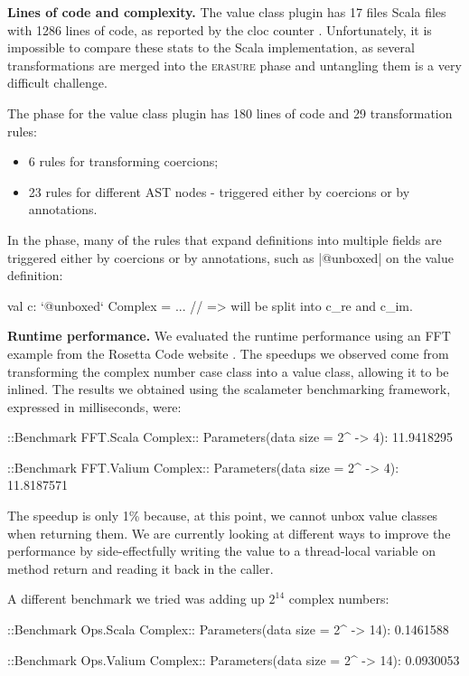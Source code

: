 \textbf{Lines of code and complexity.} The value class plugin has 17 files Scala files with 1286 lines of code, as reported by the cloc counter \cite{cloc-util}. Unfortunately, it is impossible to compare these stats to the Scala implementation, as several transformations are merged into the \textsc{erasure} phase and untangling them is a very difficult challenge.

The \commit{} phase for the value class plugin has 180 lines of code and 29 transformation rules:
\begin{itemize}
\item  6 rules for transforming coercions;
\item 23 rules for different AST nodes - triggered either by coercions or by annotations.
\end{itemize}

In the \commit{} phase, many of the rules that expand definitions into multiple fields are triggered either by coercions or by annotations, such as |@unboxed| on the value definition:

\begin{lstlisting-nobreak}
 val c: `@unboxed` Complex = ...
 //        => will be split into c_re and c_im.
\end{lstlisting-nobreak}

\textbf{Runtime performance.} We evaluated the runtime performance using an FFT example from the Rosetta Code website \cite{rosetta-code}. The speedups we observed come from transforming the complex number case class into a value class, allowing it to be inlined. The results we obtained using the scalameter \cite{scalameter} benchmarking framework, expressed in milliseconds, were:

\begin{lstlisting-nobreak}
 ::Benchmark FFT.Scala Complex::
 Parameters(data size = 2^ -> 4): 11.9418295

 ::Benchmark FFT.Valium Complex::
 Parameters(data size = 2^ -> 4): 11.8187571
\end{lstlisting-nobreak}

The speedup is only 1\% because, at this point, we cannot unbox value classes when returning them. We are currently looking at different ways to improve the performance by side-effectfully writing the value to a thread-local variable on method return and reading it back in the caller.

A different benchmark we tried was adding up $2^{14}$ complex numbers:

\begin{lstlisting-nobreak}
 ::Benchmark Ops.Scala Complex::
 Parameters(data size = 2^ -> 14): 0.1461588

 ::Benchmark Ops.Valium Complex::
 Parameters(data size = 2^ -> 14): 0.0930053
\end{lstlisting-nobreak}

